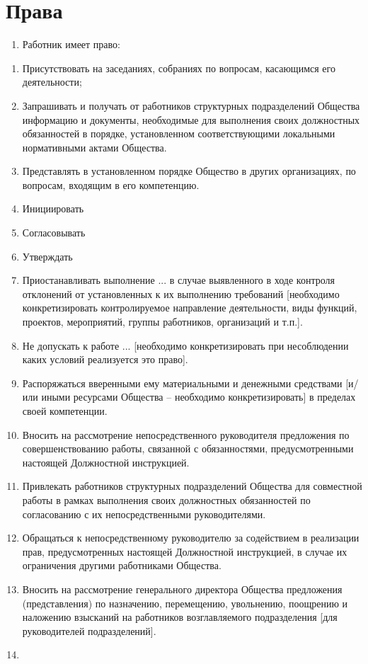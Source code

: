 \documentclass[a4paper, 12pt, twoside]{article}
\begin{document}
\section{Права}
\begin{enumerate}[label=, labelsep=0ex]
  \item Работник имеет право:
\end{enumerate}
\begin{enumerate}[label=3.\arabic*.]
  \item Присутствовать на заседаниях, собраниях по вопросам, касающимся его деятельности;
  \item Запрашивать и получать от работников структурных подразделений Общества информацию и документы, необходимые для выполнения своих должностных обязанностей в порядке, установленном соответствующими локальными нормативными актами Общества.
  \item Представлять в установленном порядке Общество в других организациях, по вопросам, входящим в его компетенцию.
  \item Инициировать
  \item Согласовывать
  \item Утверждать
  \item Приостанавливать выполнение ... в случае выявленного в ходе контроля отклонений от установленных к их выполнению требований [необходимо конкретизировать контролируемое направление деятельности, виды функций, проектов, мероприятий, группы работников, организаций и т.п.].
  \item Не допускать к работе ... [необходимо конкретизировать при несоблюдении каких условий реализуется это право].
  \item Распоряжаться вверенными ему материальными и денежными средствами [и/или иными ресурсами Общества – необходимо конкретизировать] в пределах своей компетенции.
  \item Вносить на рассмотрение непосредственного руководителя предложения по совершенствованию работы, связанной с обязанностями, предусмотренными настоящей Должностной инструкцией.
  \item Привлекать работников структурных подразделений Общества для совместной работы в рамках выполнения своих должностных обязанностей по согласованию с их непосредственными руководителями.
  \item Обращаться к непосредственному руководителю за содействием в реализации прав, предусмотренных настоящей Должностной инструкцией, в случае их ограничения другими работниками Общества.
  \item Вносить на рассмотрение генерального директора Общества предложения (представления) по назначению, перемещению, увольнению, поощрению и наложению взысканий на работников возглавляемого подразделения [для руководителей подразделений].
  \item 
\end{enumerate}
\end{document}
